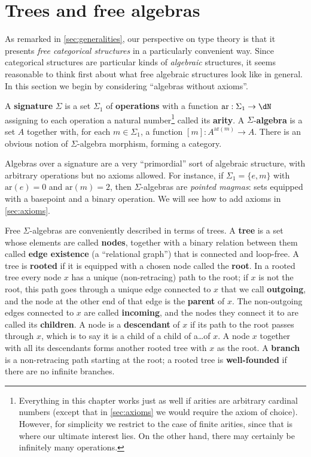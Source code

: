 \documentclass{book}
\def\ay{\mathrm{ar}}
\def\sig{\Sigma}
\def\act#1{[#1]}
\begin{document}
\section{Trees and free algebras}
\label{sec:trees}

As remarked in \cref{sec:generalities}, our perspective on type theory is that it presents \emph{free categorical structures} in a particularly convenient way.
Since categorical structures are particular kinds of \emph{algebraic} structures, it seems reasonable to think first about what free algebraic structures look like in general.
In this section we begin by considering ``algebras without axioms''.

A \textbf{signature} $\sig$ is a set $\sig_1$ of \textbf{operations} with a function $\ay:\sig_1 \to \dN$ assigning to each operation a natural number\footnote{Everything in this chapter works just as well if arities are arbitrary cardinal numbers (except that in \cref{sec:axioms} we would require the axiom of choice).
  However, for simplicity we restrict to the case of finite arities, since that is where our ultimate interest lies.
  On the other hand, there may certainly be infinitely many operations.} called its \textbf{arity}.
A $\sig$-\textbf{algebra} is a set $A$ together with, for each $m\in\sig_1$, a function $\act m :A^{\ay(m)} \to A$.
There is an obvious notion of $\sig$-algebra morphism, forming a category.

Algebras over a signature are a very ``primordial'' sort of algebraic structure, with arbitrary operations but no axioms allowed.
For instance, if $\sig_1=\{e,m\}$ with $\ay(e)=0$ and $\ay(m)=2$, then $\sig$-algebras are \emph{pointed magmas}: sets equipped with a basepoint and a binary operation.
We will see how to add axioms in \cref{sec:axioms}.

Free $\sig$-algebras are conveniently described in terms of {trees}.
A \textbf{tree} is a set whose elements are called \textbf{nodes}, together with a binary relation between them called \textbf{edge existence} (a ``relational graph'') that is connected and loop-free.
A tree is \textbf{rooted} if it is equipped with a chosen node called the \textbf{root}.
In a rooted tree every node $x$ has a unique (non-retracing) path to the root; if $x$ is not the root, this path goes through a unique edge connected to $x$ that we call \textbf{outgoing}, and the node at the other end of that edge is the \textbf{parent} of $x$.
The non-outgoing edges connected to $x$ are called \textbf{incoming}, and the nodes they connect it to are called its \textbf{children}.
A node is a \textbf{descendant} of $x$ if its path to the root passes through $x$, which is to say it is a child of a child of a\dots of $x$.
A node $x$ together with all its descendants forms another rooted tree with $x$ as the root.
A \textbf{branch} is a non-retracing path starting at the root; a rooted tree is \textbf{well-founded} if there are no infinite branches.
\end{document}
